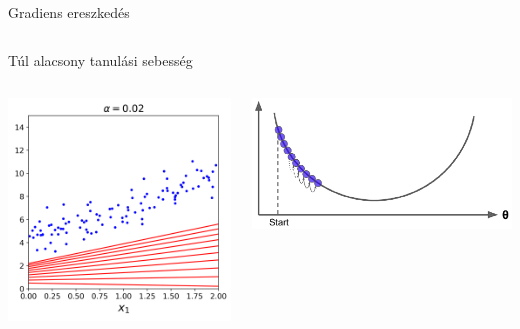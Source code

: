 \documentclass[english, aspectratio=169]{beamer}
\begin{document}
\begin{frame}{Gradiens ereszkedés}
\begin{columns}
\begin{column}{.5\textwidth}
{\begin{center}
			\end{center}}
		\end{column}
	\end{columns}
\begin{flushright}
	
	\end{flushright}\end{frame}

\begin{frame}{Túl alacsony tanulási sebesség}
	\begin{columns}
		\begin{column}{.5\textwidth}
			\begin{center}
				\includegraphics[width=6cm, keepaspectratio]{images/ql_17.png}
			\end{center}
		\end{column}
		\begin{column}{.5\textwidth}
			\begin{center}
				\includegraphics[width=7cm, keepaspectratio]{images/ql_14.png}
			\end{center}
		\end{column}
	\end{columns}
\end{frame}
\end{document}
